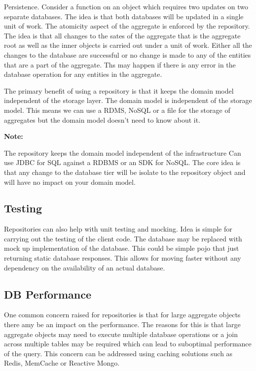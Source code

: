 \documentclass[a4paper, 11pt]{book}
\newenvironment{note}{
    \begin{siderule}
        \textbf{Note: }
        }{
    \end{siderule}
}
\begin{document}
    Persistence.
    Consider a function on an object which requires two updates on two separate databases.
    The idea is that both databases will be updated in a single unit of work.
    The atomicity aspect of the aggregate is enforced by the repository.
    The idea is that all changes to the sates of the aggregate that is the aggregate root as well as the inner objects is carried out under a unit of work.
    Either all the changes to the database are successful or no change is made to any of the entities that are a part of the aggregate.
    Ths may happen if there is any error in the database operation for any entities in the aggregate.

    The primary benefit of using a repository is that it keeps the domain model independent of the storage layer.
    The domain model is independent of the storage model.
    This means we can use a RDMS, NoSQL or a file for the storage of aggregates but the domain model doesn't need to know about it.
    \begin{note}
    The repository keeps the domain model independent of the infrastructure
    Can use JDBC for SQL against a RDBMS or an SDK for NoSQL.
    The core idea is that any change to the database tier will be isolate to the repository object and will have no impact on your domain model.
    \end{note}

    \subsection{Testing}
    Repositories can also help with unit testing and mocking.
    Idea is simple for carrying out the testing of the client code.
    The database may be replaced with mock up implementation of the database.
    This could be simple pojo that just returning static database responses.
    This allows for moving faster without any dependency on the availability of an actual database.

    \subsection{DB Performance}
    One common concern raised for repositories is that for large aggregate objects there amy be an impact on the performance.
    The reasons for this is that large aggregate objects may need to execute multiple database operations or a join across multiple tables may be required which can lead to suboptimal performance of the query.
    This concern can be addressed using caching solutions such as Redis, MemCache or Reactive Mongo.
\end{document}
